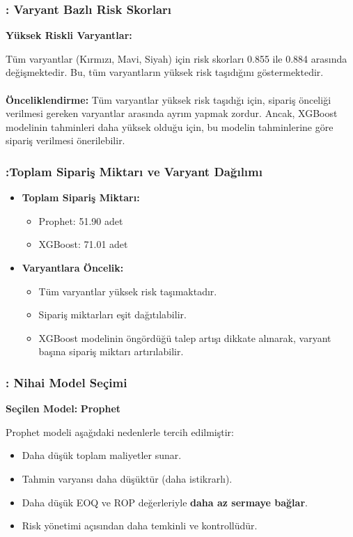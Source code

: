 \documentclass[12pt]{beamer}
\begin{document}
	\begin{frame}
		\frametitle{\insertsection: Varyant Bazlı Risk Skorları}
		\textbf{Yüksek Riskli Varyantlar:}
		
		Tüm varyantlar (Kırmızı, Mavi, Siyah) için risk skorları 0.855 ile
		0.884 arasında değişmektedir. Bu, tüm varyantların yüksek risk taşıdığını
		göstermektedir.
		\\~\\
		\textbf{Önceliklendirme:}
		Tüm varyantlar yüksek risk taşıdığı için, sipariş önceliği verilmesi
		gereken varyantlar arasında ayrım yapmak zordur. Ancak, XGBoost modelinin
		tahminleri daha yüksek olduğu için, bu modelin tahminlerine göre sipariş
		verilmesi önerilebilir.
	\end{frame}
	
	\begin{frame}
		\frametitle{\insertsection:Toplam Sipariş Miktarı ve Varyant Dağılımı}
		
		\begin{itemize}
			\item \textbf{Toplam Sipariş Miktarı:}
			\begin{itemize}
				\item Prophet: 51.90 adet
				\item XGBoost: 71.01 adet
			\end{itemize}
			
			\item \textbf{Varyantlara Öncelik:}
			\begin{itemize}
				\item Tüm varyantlar yüksek risk taşımaktadır.
				\item Sipariş miktarları eşit dağıtılabilir.
				\item XGBoost modelinin öngördüğü talep artışı dikkate
				alınarak, varyant başına sipariş miktarı artırılabilir.
			\end{itemize}
		\end{itemize}
		
	\end{frame}
	
	\begin{frame}
		\frametitle{\insertsection: Nihai Model Seçimi}
		
		\textbf{Seçilen Model:} \textcolor{blue!80!black}{\textbf{Prophet}}
		
		\vspace{0.4cm}
		Prophet modeli aşağıdaki nedenlerle tercih edilmiştir:
		
		\begin{itemize}
			\item Daha düşük toplam maliyetler sunar.
			\item Tahmin varyansı daha düşüktür (daha istikrarlı).
			\item Daha düşük EOQ ve ROP değerleriyle \textbf{daha az
				sermaye bağlar}.
			\item Risk yönetimi açısından daha temkinli ve kontrollüdür.
		\end{itemize}
	\end{frame}
	
\end{document}

